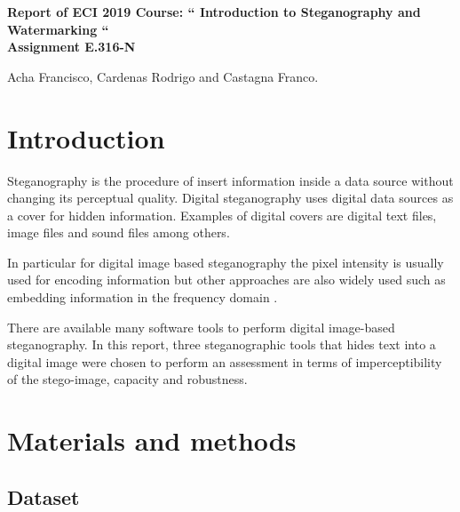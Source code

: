 \documentclass[11pt]{article}
\begin{document}
\pagestyle{empty}

\begin{center}

{\Large {\bf Report of ECI 2019 Course: `` Introduction to Steganography and Watermarking ``}} \\

\bigskip
{\large \bf Assignment E.316-N}
\end{center}

\begin{center}
Acha Francisco, Cardenas Rodrigo and Castagna Franco.
\end{center}


\section{Introduction}

Steganography is the procedure of insert information inside a data source without changing its perceptual quality.
Digital steganography uses digital data sources as a cover for hidden information. Examples of digital covers
are digital text files, image files and sound files among others.  

In particular for digital image based steganography the pixel intensity is usually used for encoding information 
but other approaches are also widely used such as embedding information in the frequency domain \cite{Shih-Book}.



There are available many software tools to perform digital image-based steganography.
In this report, three steganographic tools that hides text into a digital image were chosen to perform an assessment 
in terms of imperceptibility of the stego-image, capacity and robustness.

\section{Materials and methods}

\subsection{Dataset}
\end{document}

